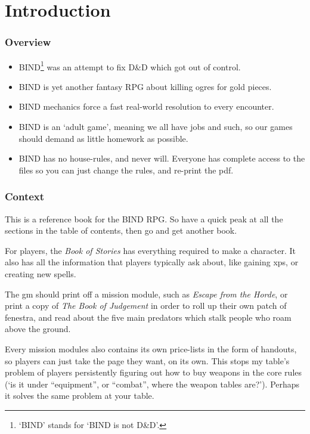 \chapter*{Introduction}

\begin{multicols}{2}

\subsection*{Overview}

\begin{itemize}
  \item
  BIND\footnote{`BIND' stands for `BIND is not D\&D'.} was an attempt to fix D\&D which got out of control.
  \item
  BIND is yet another fantasy RPG about killing ogres for gold pieces.
  \item
  BIND mechanics force a fast real-world resolution to every encounter.
  \item
  BIND is an `adult game', meaning we all have jobs and such, so our games should demand as little homework as possible.
  \item
  BIND has no house-rules, and never will.
  Everyone has complete access to the files so you can just change the rules, and re-print the \gls{pdf}.
\end{itemize}

\subsection*{Context}

This is a reference book for the BIND RPG.
So have a quick peak at all the sections in the table of contents, then go and get another book.

For players, the \textit{Book of Stories} has everything required to make a character.
It also has all the information that players typically ask about, like gaining \glspl{xp}, or creating new spells.

The \gls{gm} should print off a mission module, such as \textit{Escape from the Horde}, or print a copy of \textit{The Book of Judgement} in order to roll up their own patch of \gls{fenestra}, and read about the five main predators which stalk people who roam above the ground.

Every mission modules also contains its own price-lists in the form of handouts, so players can just take the page they want, on its own.
This stops my table's problem of players persistently figuring out how to buy weapons in the core rules (`is it under ``equipment'', or ``combat'', where the weapon tables are?').
Perhaps it solves the same problem at your table.


\end{multicols}
